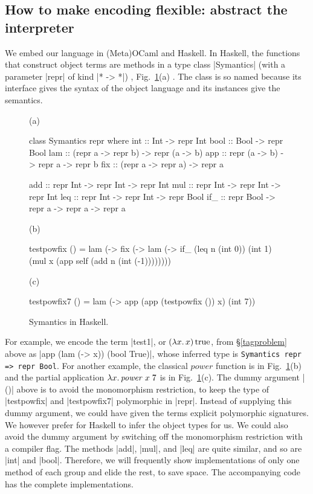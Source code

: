 \subsection{How to make encoding flexible: abstract the interpreter}
\label{encoding}
We embed our language in (Meta)OCaml and Haskell.  In Haskell,
the functions that construct object terms are methods in a type class
|Symantics| (with a parameter |repr| of kind |* -> *|)%
, Fig.~\ref{fig:symantics-haskell}(a)%
. The class is so named
because its interface gives the syntax of the object language and its
instances give the semantics.
\begin{figure}
%
(a) \begin{code2}
class Symantics repr where
  int  :: Int  -> repr Int       bool :: Bool -> repr Bool
  lam :: (repr a -> repr b) -> repr (a -> b)
  app :: repr (a -> b) -> repr a -> repr b
  fix :: (repr a -> repr a) -> repr a

  add :: repr Int -> repr Int -> repr Int
  mul :: repr Int -> repr Int -> repr Int
  leq :: repr Int -> repr Int -> repr Bool
  if_ :: repr Bool -> repr a -> repr a -> repr a
\end{code2}

(b) \begin{code2}
testpowfix () = lam (\x -> fix (\self -> lam (\n ->
                 if_ (leq n (int 0)) (int 1)
                     (mul x (app self (add n (int (-1))))))))
\end{code2}

(c) \begin{code2}
testpowfix7 () = lam (\x -> app (app (testpowfix ()) x) (int 7))
\end{code2}
\caption{Symantics in Haskell.}
\label{fig:symantics-haskell}
\end{figure}
For example, we encode the term |test1|, or $(\mathopen{\lambda\mathord{x}.\,}x)\mathinner{\mathrm{true}}$, from
\S\ref{tagproblem} above as |app (lam (\x -> x)) (bool True)|,
whose inferred type is \texttt{Symantics repr => repr Bool}.
For another example, the classical $\mathit{power}$ function is
in Fig.~\ref{fig:symantics-haskell}(b)
and the partial application $\mathopen{\lambda\mathord{x}.\,} \mathit{power}\;x\;7$ is
in Fig.~\ref{fig:symantics-haskell}(c).
The dummy argument |()| above is to avoid the monomorphism
restriction, to keep the type of |testpowfix| and |testpowfix7|
polymorphic in |repr|. Instead of supplying this dummy
argument, we could have given the terms explicit polymorphic
signatures.  We however prefer for
Haskell to infer the object types for us. We could also
avoid the dummy argument by switching off the monomorphism restriction
with a compiler flag.
The methods |add|, |mul|, and |leq| are quite similar, and so are
|int| and |bool|. Therefore, we will frequently show implementations of
only one method of each group and elide the rest, to save space. The
accompanying code has the complete implementations.


